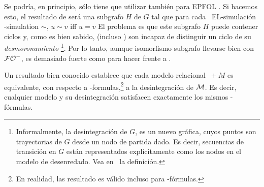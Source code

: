 Se podr\'ia, en principio, s\'olo tiene que utilizar  tambi\'en para EPFOL
\EL. Si hacemos esto, el resultado de  ser\'a una
subgrafo $ H $ de $ G $ tal que para cada \ EL-simulaci\'on \EL-simulation $\sim$, $u
\sim v$ iff $u = v$ El problema es que este subgrafo $ H $ puede
contener ciclos y, como es bien sabido, \EL (incluso \ALC) son
incapaz de distinguir un ciclo de su {\em
desmoronamiento} \footnote {Informalmente, la desintegraci\'on de $ G $, es un nuevo
gr\'afica, cuyos puntos son trayectorias de $ G $ desde un nodo de partida dado.
Es decir, secuencias de transici\'on en $ G $ est\'an representados expl\'icitamente como
los nodos en el modelo de desenredado. Vea en~\cite{BRV01} la definici\'on.}. Por lo tanto, aunque isomorfismo subgrafo llevarse bien con
${\mathcal{FO}^-}$, es demasiado fuerte como para hacer frente a \EL.
%
%



Un resultado bien conocido establece que cada modelo relacional $ \ + M $ es
equivalente, con respecto a \EL-formulas,\footnote{En realidad, las
resultado es v\'alido incluso para \ALC-f\'ormulas.} a la desintegraci\'on de $\mathcal{M}$.
Es decir, cualquier modelo y su desintegraci\'on satisfacen exactamente los mismos \EL-f\'ormulas.
%


